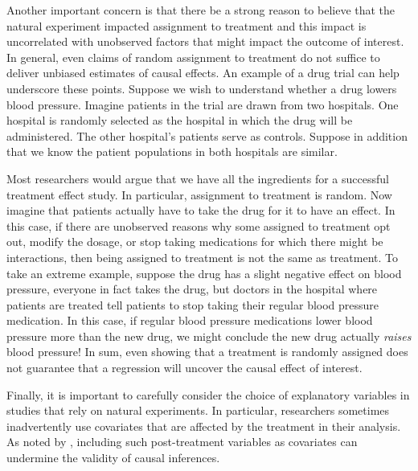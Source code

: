 \documentclass[12pt,reqno,titlepage]{amsart}
\begin{document}
\begin{doublespace}
Another important concern is that there be a strong reason to believe that the natural experiment impacted assignment to treatment and this impact is uncorrelated with unobserved factors that might impact the outcome of interest. 
In general, even claims of random assignment to treatment do not suffice to deliver unbiased estimates of causal effects.
An example of a drug trial can help underscore these points. 
Suppose we wish to understand whether a drug lowers blood pressure. 
Imagine patients in the trial are drawn from two hospitals.
One hospital is randomly selected as the hospital in which the drug will be administered. 
The other hospital's patients serve as controls. 
Suppose in addition that we know the patient populations in both hospitals are similar. 

Most researchers would argue that we have all the ingredients for a successful treatment effect study.
In particular, assignment to treatment is random.
Now imagine that patients actually have to take the drug for it to have an effect.
In this case, if there are unobserved reasons why some assigned to treatment opt out, modify the dosage, or stop taking medications for which there might be interactions, then being assigned to treatment is not the same as treatment. 
To take an extreme example, suppose the drug has a slight negative effect on blood pressure, everyone in fact takes the drug, but doctors in the hospital where patients are treated tell patients to stop taking their regular blood pressure medication. 
In this case, if regular blood pressure medications lower blood pressure more than the new drug, we might conclude the new drug actually \emph{raises} blood pressure! 
In sum, even showing that a treatment is randomly assigned does not guarantee that a regression will uncover the causal effect of interest. 

Finally, it is important to carefully consider the choice of explanatory variables in studies that rely on natural experiments.
In particular, researchers sometimes inadvertently use covariates that are affected by the treatment in their analysis.  
As noted by \citet[p.\,116]{Imbens:2015aa}, including such post-treatment variables as covariates can undermine the validity of causal inferences.


\end{doublespace}
\end{document}
